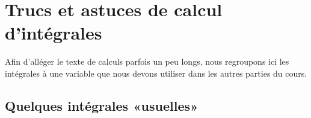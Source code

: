 
\section{Trucs et astuces de calcul d'intégrales}
\label{SECooKSOFooEVKDLh}

Afin d'alléger le texte de calculs parfois un peu longs, nous regroupons ici les intégrales à une variable que nous devons utiliser dans les autres parties du cours.

\subsection{Quelques intégrales «usuelles»}

